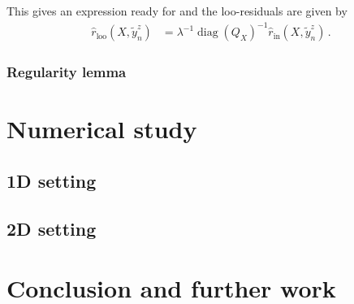\documentclass[a4paper,14pt]{article}
\newcommand{\diag}{\mathop{\text{diag}}\nolimits}
\begin{document}
This gives an expression ready for
and the loo-residuals are given by
\begin{align}
  \hat{r}_{\text{loo}}(X, \tilde{y}_n^z)
  &= \lambda^{-1} \diag(Q_X)^{-1} \hat{r}_{\text{in}}(X, \tilde{y}_n^z) \label{eq:krr_loo_resid} \,.
\end{align}


\subsubsection{Regularity lemma} %
\label{ssub:regularity_lemma}




\section{Numerical study} %
\label{sec:numerical_study}

\subsection{1D setting} %
\label{sub:1d_setting}


\subsection{2D setting} %
\label{sub:2d_setting}



\section{Conclusion and further work} %
\label{sec:conclusion_and_further_work}

\end{document}
